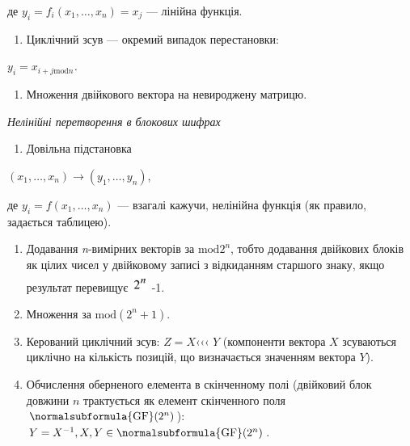 де  ${y_{{i}}=f_{{i}}(x_{{1}},\dots,x_{{n}})=x_{{j}}}$ ---
лінійна функція.

\liststyleWWviiiNumiii
\setcounter{saveenum}{\value{enumi}}
\begin{enumerate}
\setcounter{enumi}{\value{saveenum}}
\item Циклічний зсув  ---  окремий випадок перестановки:
\end{enumerate}
{\centering\itshape
 ${y_{{i}}=x_{{i+j\text{mod}n}}}$.
\par}

\liststyleWWviiiNumiii
\setcounter{saveenum}{\value{enumi}}
\begin{enumerate}
\setcounter{enumi}{\value{saveenum}}
\item Множення двійкового вектора на невироджену матрицю.
\end{enumerate}

\bigskip


\bigskip


\bigskip


\bigskip

{\centering\itshape
Нелінійні перетворення в блокових шифрах
\par}


\bigskip

\liststyleWWviiiNumxxxii
\begin{enumerate}
\item Довільна підстановка
\end{enumerate}
{\centering
 ${(x_{{1}},\dots,x_{{n}})\rightarrow
(y_{{1}},\dots,y_{{n}})}$,
\par}

де  ${y_{{i}}=f(x_{{1}},\dots,x_{{n}})}$ --- взагалі кажучи,
нелінійна функція (як правило, задається таблицею).

\liststyleWWviiiNumxxxii
\setcounter{saveenum}{\value{enumi}}
\begin{enumerate}
\setcounter{enumi}{\value{saveenum}}
\item Додавання \textit{n}{}-вимірних векторів за  ${\text{mod}2^{{n}}}$, тобто
додавання двійкових блоків як цілих чисел у двійковому записі з відкиданням
старшого знаку, якщо результат перевищує 
\includegraphics[width=0.2083in,height=0.2362in]{crypt-img/crypt-img294.png}
{}-1. 
\item Множення за  ${\text{mod}(2^{{n}}+1)}$.
\item Керований циклічний зсув: \textbf{ } ${Z=X}$‹‹‹ ${Y}$ (компоненти вектора 
${X}$ зсуваються циклічно на кількість позицій, що визначається значенням
вектора ${Y}$).
\item Обчислення оберненого  елемента  в скінченному полі (двійковий блок
довжини  ${n}$ трактується як елемент скінченного поля 
${\normalsubformula{\text{GF}}(2^{{n}})}$):   ${Y=X^{{-1}},X,Y\in
\normalsubformula{\text{GF}}(2^{{n}})}$.
\end{enumerate}

